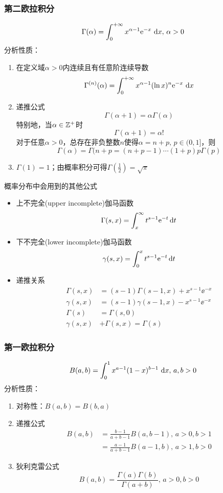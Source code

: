 \subsubsection{第二欧拉积分}
\[\Gamma(\alpha)=\displaystyle\int_{0}^{+\infty}{x^{\alpha-1}\mathrm{e}^{-x}}\,\,\mathrm{d} x,\,\alpha>0\]
分析性质：
\begin{enumerate}
	\item 在定义域$\alpha>0$内连续且有任意阶连续导数
	\[\Gamma^{(n)}(\alpha)=\displaystyle\int_{0}^{+\infty}{x^{\alpha-1}(\ln x)^n\mathrm{e}^{-x}}\,\,\mathrm{d} x\]
	\item 递推公式
	\[\Gamma(\alpha+1)=\alpha\Gamma(\alpha)\]
	特别地，当$\alpha\in\mathbb{Z}^+$时
	\[\Gamma(\alpha+1)=\alpha!\]
	对于任意$\alpha>0$，总存在非负整数$n$使得$\alpha=n+p,\,p\in(0,1]$，则
	\[\Gamma(\alpha)=\Gamma(n+p=(n+p-1)\cdots(1+p)p\Gamma(p)\]
	\item $\Gamma(1)=1$；由概率积分可得$\Gamma(\frac{1}{2})=\sqrt{\pi}$
\end{enumerate}
概率分布中会用到的其他公式
\begin{itemize}
\item 上不完全(upper incomplete)伽马函数
\[ \Gamma(s,x) = \int_x^{\infty} t^{s-1}\mathrm{e}^{-t}\,\mathrm{d} t\]
\item 下不完全(lower incomplete)伽马函数
\[ \gamma(s,x) = \int_{0}^{x}t^{s-1}\mathrm{e}^{-t}\,\mathrm{d} t\]
\item 递推关系
\[\begin{aligned}
\Gamma(s,x)&=(s-1)\Gamma(s-1,x) + x^{s-1} \ee^{-x}\\
\gamma(s,x)&=(s-1)\gamma(s-1,x) - x^{s-1} \ee^{-x}\\
\Gamma(s) &= \Gamma(s,0)\\
\gamma (s,x)&+\Gamma (s,x)=\Gamma (s)
\end{aligned}\]
\end{itemize}

\subsubsection{第一欧拉积分}
\[B(a,b)=\displaystyle\int_{0}^{1}{x^{a-1}(1-x)^{b-1}}\,\,\mathrm{d} x,\,a,b>0\]
分析性质：
\begin{enumerate}
	\item 对称性：$B(a,b)=B(b,a)$
	\item 递推公式
	\[\begin{aligned}
	B(a,b)&=\frac{b-1}{a+b-1}B(a,b-1),\,a>0,b>1\\
	&=\frac{a-1}{a+b-1}B(a-1,b),\,a>1,b>0
	\end{aligned}\]
	\item 狄利克雷公式
	\[B(a,b)=\frac{\Gamma(a)\Gamma(b)}{\Gamma(a+b)},\,a>0,b>0\]
\end{enumerate}